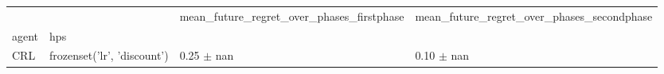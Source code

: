\begin{tabular}{llll}
\toprule
 &  & mean_future_regret_over_phases_firstphase & mean_future_regret_over_phases_secondphase \\
agent & hps &  &  \\
\midrule
CRL & frozenset({'lr', 'discount'}) & 0.25 $\pm$ nan & 0.10 $\pm$ nan \\
\cline{1-4}
\bottomrule
\end{tabular}
